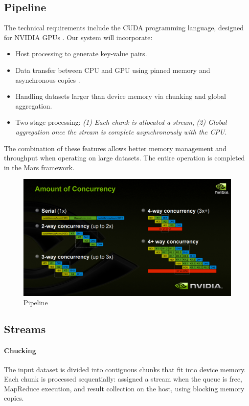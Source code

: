 \documentclass{article}
\begin{document}
\subsection{Pipeline}
The technical requirements include the CUDA programming language, designed for NVIDIA GPUs \cite{cuda_docs}. Our system will incorporate:
\begin{itemize}
    \item Host processing to generate key-value pairs.
    \item Data transfer between CPU and GPU using pinned memory and asynchronous copies \cite{cuda_mem_pool}.
    \item Handling datasets larger than device memory via chunking and global aggregation.
    \item Two-stage processing: \textit{(1) Each chunk is allocated a stream}, \textit{(2) Global aggregation once the stream is complete asynchronously with the CPU.}
\end{itemize}

The combination of these features allows better memory management and throughput when operating on large datasets. The entire operation is completed in the Mars framework.

\begin{figure}[ht]
    \centering
    \includegraphics[width=.8\linewidth]{./images/async.png}
    \caption{Pipeline \cite{pipeline}}
    \label{fig:async}
\end{figure}

\subsection{Streams}

\paragraph{Chucking} The input dataset is divided into contiguous chunks that fit into device memory. Each chunk is processed sequentially: assigned a stream when the queue is free, MapReduce execution, and result collection on the host, using blocking memory copies.
\end{document}

